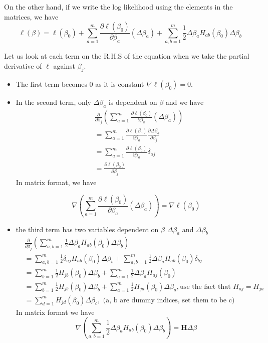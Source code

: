 \documentclass[12pt, oneside]{article}
\begin{document}
On the other hand, if we write the log likelihood using the elements in the matrices, we have 
\begin{equation}
\ell({\beta})=\ell({\beta_0})+\sum\limits_{a=1}^m\frac{\partial{\ell(\beta_0)}}{\partial\beta_a}(\Delta\beta_a)+\sum\limits_{a,b=1}^m\frac{1}{2}\Delta\beta_a{H_{ab}}(\beta_0)\Delta\beta_b
\end{equation}

Let us look at each term on the R.H.S of the equation when we take the partial derivative of $\ell$ against $\beta_j$. 
\begin{itemize}
\item The first term becomes 0 as it is constant $\nabla \ell(\beta_0)=0$.
\item In the second term, only $\Delta\beta_a$ is dependent on $\beta$ and we have
\begin{align*}
&\frac{\partial}{\partial\beta_j}\left(\sum\limits_{a=1}^m\frac{\partial{\ell(\beta_0)}}{\partial\beta_a}(\Delta\beta_a)\right)\\
&=\sum\limits_{a=1}^m\frac{\partial{\ell(\beta_0)}}{\partial\beta_a}\frac{\partial \Delta\beta_a}{\partial\beta_j}\\
&=\sum\limits_{a=1}^m\frac{\partial{\ell(\beta_0)}}{\partial\beta_a}\delta_{aj}\\
&=\frac{\partial{\ell(\beta_0)}}{\partial\beta_j}
\end{align*}
In matrix format, we have 

$$\nabla\left(\sum\limits_{a=1}^m\frac{\partial{\ell(\beta_0)}}{\partial\beta_a}(\Delta\beta_a)\right)= \nabla \ell(\beta_0)$$

\item  the third term has two variables dependent on $\beta$ $\Delta\beta_a$ and $\Delta\beta_b$
\begin{align*}
&\frac{\partial}{\partial\beta_j}\left(\sum\limits_{a,b=1}^m\frac{1}{2}\Delta\beta_a{H_{ab}}(\beta_0)\Delta\beta_b\right)\\
&=\sum\limits_{a,b=1}^m\frac{1}{2}\delta_{aj}{H_{ab}}(\beta_0)\Delta\beta_b+\sum\limits_{a,b=1}^m\frac{1}{2}\Delta\beta_a{H_{ab}}(\beta_0)\delta_{bj}\\
&=\sum\limits_{b=1}^m\frac{1}{2}{H_{jb}}(\beta_0)\Delta\beta_b+\sum\limits_{a=1}^m\frac{1}{2}\Delta\beta_a{H_{aj}}(\beta_0)\\
&=\sum\limits_{b=1}^m\frac{1}{2}{H_{jb}}(\beta_0)\Delta\beta_b+\sum\limits_{a=1}^m\frac{1}{2}{H_{ja}}(\beta_0)\Delta\beta_a, \text{use the fact that } H_{aj}=H_{ja}\\
&=\sum\limits_{d=1}^m{H_{jd}}(\beta_0)\Delta\beta_{c}, \text{ (a, b are dummy indices, set them to be c)}
\end{align*}
In matrix format we have $$\nabla\left(\sum\limits_{a,b=1}^m\frac{1}{2}\Delta\beta_a{H_{ab}}(\beta_0)\Delta\beta_b\right)=\mathbf{H}\Delta\beta$$
\end{itemize}
\end{document}
